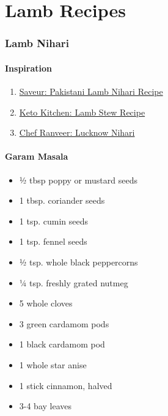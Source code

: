 \documentclass[
]{article}
\providecommand{\tightlist}{%
  \setlength{\itemsep}{0pt}\setlength{\parskip}{0pt}}
\begin{document}
\hypertarget{part-lamb-recipes}{%
\part{Lamb Recipes}\label{part-lamb-recipes}}

\hypertarget{lamb-nihari}{%
\section{Lamb Nihari}\label{lamb-nihari}}

\hypertarget{inspiration}{%
\subsection{Inspiration}\label{inspiration}}

\begin{enumerate}
\def\labelenumi{\arabic{enumi}.}
\tightlist
\item
  \href{https://www.saveur.com/article/recipes/pakistani-slow-cooked-lamb-stew-dumbay-ki-nihari/}{Saveur: Pakistani Lamb Nihari Recipe}
\item
  \href{https://www.myketokitchen.com/keto-recipes/lamb-stew-pressure-cooker/}{Keto Kitchen: Lamb Stew Recipe}
\item
  \href{https://www.youtube.com/watch?v=axon9qBTmXc\&ab_channel=ChefRanveer}{Chef Ranveer: Lucknow Nihari}
\end{enumerate}

\hypertarget{garam-masala}{%
\subsection{Garam Masala}\label{garam-masala}}

\begin{itemize}
\tightlist
\item
  1⁄2 tbsp poppy or mustard seeds
\item
  1 tbsp. coriander seeds
\item
  1 tsp. cumin seeds
\item
  1 tsp. fennel seeds
\item
  1⁄2 tsp. whole black peppercorns
\item
  1⁄4 tsp. freshly grated nutmeg
\item
  5 whole cloves
\item
  3 green cardamom pods
\item
  1 black cardamom pod
\item
  1 whole star anise
\item
  1 stick cinnamon, halved
\item
  3-4 bay leaves
\end{itemize}
\end{document}
